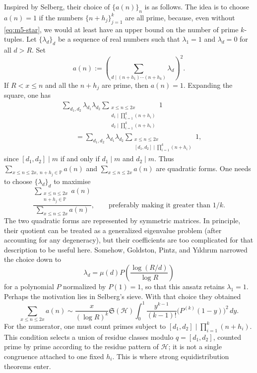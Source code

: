 \documentclass[11pt,a4paper]{article}
\begin{document}
Inspired by Selberg, their choice of $\{a(n)\}_n$ is as follows.
The idea is to choose $a(n)=1$ if the numbers
$\{n+h_j\}_{j=1}^k$ are all prime, because, even without
\eqref{eq:m5-star}, we would at least have an upper bound on the number
of prime $k$-tuples.
Let $\{\lambda_d\}_d$ be a sequence of real numbers such that
$\lambda_1=1$ and $\lambda_d=0$ for all $d>R$. Set
\[
 a(n):=\left(\sum_{d\mid(n+h_1)\cdots(n+h_k)}\lambda_d\right)^2.
\]
If $R<x\le n$ and all the $n+h_j$ are prime, then $a(n)=1$.
Expanding the square, one has
\[
 \begin{aligned}
 &\sum_{d_1,d_2}\lambda_{d_1}\lambda_{d_2}
 \sum_{\substack{x\le n\le2x\\
 d_1\mid\prod_{i=1}^k(n+h_i)\\d_2\mid\prod_{i=1}^k(n+h_i)}}1\\
 &\qquad=
 \sum_{d_1,d_2}\lambda_{d_1}\lambda_{d_2}
 \sum_{\substack{x\le n\le2x\\{}[d_1,d_2]\mid\prod_{i=1}^k(n+h_i)}}1,
 \end{aligned}
\]
since $[d_1,d_2]\mid m$ if and only if $d_1\mid m$ and $d_2\mid m$.
Thus $\sum_{x\le n\le2x,\ n+h_j\in\mathbb P}a(n)$ and
$\sum_{x\le n\le2x}a(n)$ are quadratic forms. One needs to choose
$\{\lambda_d\}_d$ to maximise
\[
 \frac{\displaystyle\sum_{\substack{x\le n\le2x\\n+h_j\in\mathbb P}}a(n)}
 {\displaystyle\sum_{x\le n\le2x}a(n)},
 \qquad\text{preferably making it greater than }1/k.
\]
The two quadratic forms are represented by symmetric matrices. In principle,
their quotient can be treated as a generalized eigenvalue problem (after
accounting for any degeneracy), but their coefficients are too complicated for
that description to be useful here. Somehow, Goldston, Pintz, and Y{\i}ld{\i}r{\i}m
narrowed the choice down to
\[
 \lambda_d=\mu(d)P\left(\frac{\log(R/d)}{\log R}\right)
\]
for a polynomial $P$ normalized by $P(1)=1$, so that this ansatz retains
$\lambda_1=1$. Perhaps the motivation lies in Selberg's sieve. With that
choice they obtained
\[
 \sum_{x\le n\le2x}a(n)\sim
 \frac{x}{(\log R)^k}\mathfrak S(\mathcal H)
 \int_0^1\frac{y^{k-1}}{(k-1)!}\bigl(P^{(k)}(1-y)\bigr)^2\,dy.
\]
For the numerator, one must count primes subject to
$[d_1,d_2]\mid\prod_{i=1}^k(n+h_i)$. This condition selects a union of
residue classes modulo $q=[d_1,d_2]$, counted prime by prime according to
the residue pattern of $\mathcal H$; it is not a single congruence attached
to one fixed $h_i$. This is where strong equidistribution theorems enter.
\end{document}

